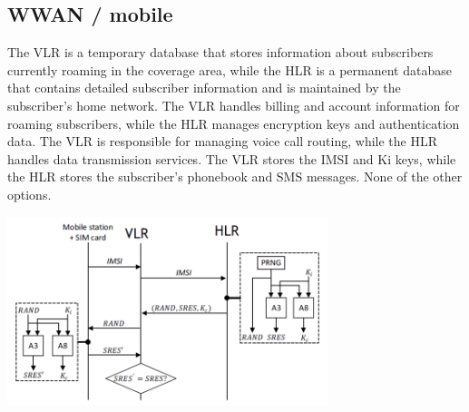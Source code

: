\begin{questions}
    \section{WWAN / mobile}





    \begin{checkboxes}
        \CorrectChoice The VLR is a temporary database that stores information about subscribers currently roaming in the coverage area, while the HLR is a permanent database that contains detailed subscriber information and is maintained by the subscriber's home network.
        \choice The VLR handles billing and account information for roaming subscribers, while the HLR manages encryption keys and authentication data.
        \choice The VLR is responsible for managing voice call routing, while the HLR handles data transmission services.
        \choice The VLR stores the IMSI and Ki keys, while the HLR stores the subscriber's phonebook and SMS messages.
        \choice None of the other options.
    \end{checkboxes}


    \begin{solution}
        \center
        \includegraphics[width=0.7\textwidth]{images/GSM_auth.png}
    \end{solution}




\end{questions}
